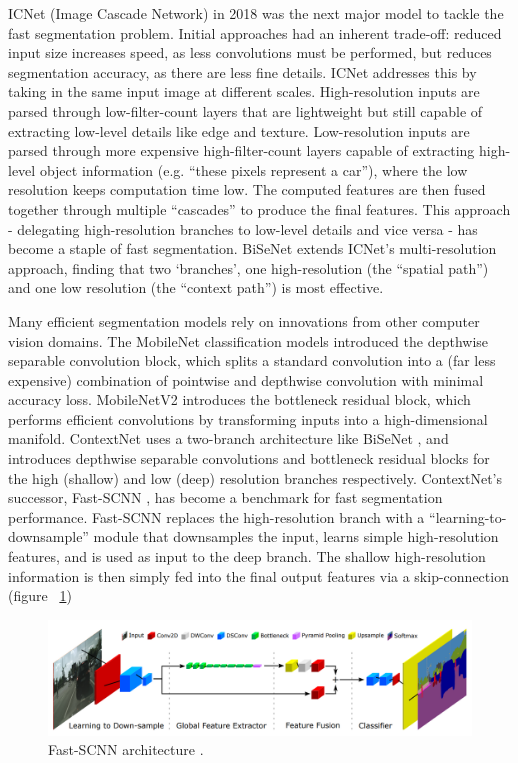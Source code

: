 \documentclass[a4paper,12pt]{report}
\begin{document}
    ICNet (Image Cascade Network) \cite{zhao_icnet_2018} in 2018 was the next major model to tackle the fast segmentation problem. Initial approaches had an inherent trade-off: reduced input size increases speed, as less convolutions must be performed, but reduces segmentation accuracy, as there are less fine details. ICNet addresses this by taking in the same input image at different scales. High-resolution inputs are parsed through low-filter-count layers that are lightweight but still capable of extracting low-level details like edge and texture. Low-resolution inputs are parsed through more expensive high-filter-count layers capable of extracting high-level object information (e.g. “these pixels represent a car”), where the low resolution keeps computation time low. The computed features are then fused together through multiple “cascades” to produce the final features. This approach - delegating high-resolution branches to low-level details and vice versa - has become a staple of fast segmentation. BiSeNet \cite{yu_bisenet_2018} extends ICNet’s multi-resolution approach, finding that two ‘branches’, one high-resolution (the “spatial path”) and one low resolution (the “context path”) is most effective.
    
    Many efficient segmentation models rely on innovations from other computer vision domains. The MobileNet \cite{howard_mobilenets_2017} classification models introduced the depthwise separable convolution block, which splits a standard convolution into a (far less expensive) combination of pointwise and depthwise convolution with minimal accuracy loss. MobileNetV2 \cite{sandler_mobilenetv2_2019} introduces the bottleneck residual block, which performs efficient convolutions by transforming inputs into a high-dimensional manifold. ContextNet \cite{poudel_contextnet_2018} uses a two-branch architecture like BiSeNet \cite{yu_bisenet_2018}, and introduces depthwise separable convolutions and bottleneck residual blocks for the high (shallow) and low (deep) resolution branches respectively. ContextNet’s successor, Fast-SCNN \cite{poudel_fast-scnn_2019}, has become a benchmark for fast segmentation performance. Fast-SCNN replaces the high-resolution branch with a “learning-to-downsample” module that downsamples the input, learns simple high-resolution features, and is used as input to the deep branch. The shallow high-resolution information is then simply fed into the final output features via a skip-connection (figure ~\ref{fig:fastscnn_architecture})
    
    \begin{figure}[h]
        \centering
        \includegraphics[width=\textwidth]{res/fastscnn-architecture.png}
        \caption{Fast-SCNN architecture \cite{poudel_fast-scnn_2019}.}
        \label{fig:fastscnn_architecture}
    \end{figure}
    
\end{document}
